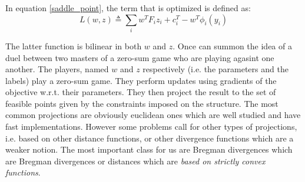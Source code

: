 In equation \ref{saddle_point}, the term that is optimized is defined as:
\begin{equation}
  {L}( w, z) \triangleq \sum_i w^T F_i z_i + c_i^T - w^T \phi_i( y_i)
  \label{saddle_obj}
\end{equation}


\clearpage

The latter function is bilinear in both $w$ and $z$. Once can summon the idea of
a duel between two masters of a zero-sum game who are playing agasint one
another. The players, named $w$ and $z$ 
respectively (i.e. the parameters and the labels) play a zero-sum game. They
perform updates using gradients of the objective w.r.t. their parameters. They
then project the result to the set of feasible points given by the constraints
imposed on the structure. The most common projections are obviously euclidean
ones which are well studied and have fast implementations. However some problems
call for other types of projections, i.e. based on other distance functions, or
other divergence functions which are a weaker notion. The most important class
for us are Bregman divergences which are Bregman divergences or distances which
are \emph{based on strictly convex functions}. 

